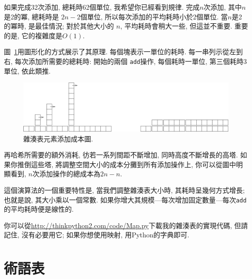 \documentclass[10pt]{book}
\begin{document}
如果完成32次添加, 總耗時62個單位, 我希望你已經看到規律.
完成$n$次添加, 其中$n$是2的冪,
總耗時是 $2n-2$個單位, 所以每次添加的平均耗時小於2個單位.
當$n$是2的冪時, 是最佳情況;
對於其他大小的 $n$, 平均耗時會稍大一些, 但這並不重要.
重要的是, 它的複雜度是$O(1)$.

圖~\ref{fig.hash}用圖形化的方式展示了其原理. 
每個塊表示一單位的耗時. 
每一串列示從左到右, 每次添加所需要的總耗時: 開始的兩個
{\tt add}操作, 每個耗時一單位, 第三個耗時3單位, 依此類推. 

\begin{figure}
\centerline{\includegraphics[width=5.5in]{figs/towers.pdf}}
\caption{雜湊表元素添加成本圖.\label{fig.hash}}
\end{figure}

再哈希所需要的額外消耗, 彷若一系列間距不斷增加, 同時高度不斷增長的高塔.
如果你推倒這些塔, 將調整空間大小的成本分攤到所有添加操作上, 
你可以從圖中明顯看到, $n$次添加操作的總成本為$2n-n$.

這個演算法的一個重要特性是, 當我們調整雜湊表大小時, 其耗時呈幾何方式增長;
也就是說, 其大小乘以一個常數.
如果你增大其規模---每次增加固定數量---每次{\tt add}的平均耗時便是線性的.

你可以從\url{http://thinkpython2.com/code/Map.py}下載我的雜湊表的實現代碼,
但請記住, 沒有必要用它; 如果你想使用映射, 用Python的字典即可.

\section{術語表}
\end{document}
